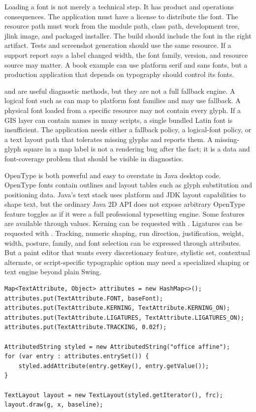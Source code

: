 Loading a font is not merely a technical step. It has product and operations consequences. The application must have a license to distribute the font. The resource path must work from the module path, class path, development tree, jlink image, and packaged installer. The build should include the font in the right artifact. Tests and screenshot generation should use the same resource. If a support report says a label changed width, the font family, version, and resource source may matter. A book example can use platform serif and sans fonts, but a production application that depends on typography should control its fonts.

 and  are useful diagnostic methods, but they are not a full fallback engine. A logical font such as  can map to platform font families and may use fallback. A physical font loaded from a specific resource may not contain every glyph. If a GIS layer can contain names in many scripts, a single bundled Latin font is insufficient. The application needs either a fallback policy, a logical-font policy, or a text layout path that tolerates missing glyphs and reports them. A missing-glyph square in a map label is not a rendering bug after the fact; it is a data and font-coverage problem that should be visible in diagnostics.

OpenType is both powerful and easy to overstate in Java desktop code. OpenType fonts contain outlines and layout tables such as glyph substitution and positioning data. Java's text stack uses platform and JDK layout capabilities to shape text, but the ordinary Java 2D API does not expose arbitrary OpenType feature toggles as if it were a full professional typesetting engine. Some features are available through  values. Kerning can be requested with . Ligatures can be requested with . Tracking, numeric shaping, run direction, justification, weight, width, posture, family, and font selection can be expressed through attributes. But a paint editor that wants every discretionary feature, stylistic set, contextual alternate, or script-specific typographic option may need a specialized shaping or text engine beyond plain Swing.

\begin{lstlisting}[caption={Text attributes for kerning, ligatures, and tracking.}]
Map<TextAttribute, Object> attributes = new HashMap<>();
attributes.put(TextAttribute.FONT, baseFont);
attributes.put(TextAttribute.KERNING, TextAttribute.KERNING_ON);
attributes.put(TextAttribute.LIGATURES, TextAttribute.LIGATURES_ON);
attributes.put(TextAttribute.TRACKING, 0.02f);

AttributedString styled = new AttributedString("office affine");
for (var entry : attributes.entrySet()) {
    styled.addAttribute(entry.getKey(), entry.getValue());
}

TextLayout layout = new TextLayout(styled.getIterator(), frc);
layout.draw(g, x, baseline);
\end{lstlisting}

